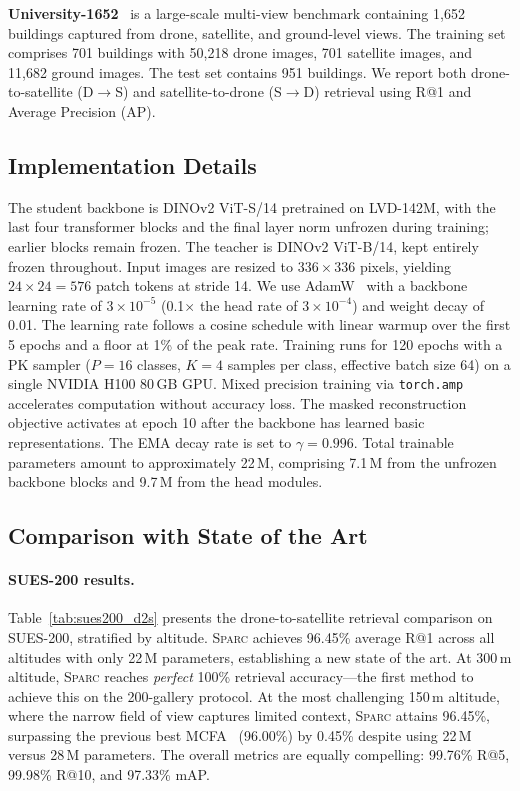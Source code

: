 \documentclass[sigconf, anonymous, review]{acmart}
\newcommand{\ours}{\textsc{Sparc}}
\begin{document}
\textbf{University-1652}~\cite{zheng2020university1652} is a large-scale multi-view benchmark containing 1{,}652 buildings captured from drone, satellite, and ground-level views.
The training set comprises 701 buildings with 50{,}218 drone images, 701 satellite images, and 11{,}682 ground images.
The test set contains 951 buildings.
We report both drone-to-satellite (D${\to}$S) and satellite-to-drone (S${\to}$D) retrieval using R@1 and Average Precision (AP).

\subsection{Implementation Details}
\label{sec:impl}

The student backbone is DINOv2 ViT-S/14 pretrained on LVD-142M, with the last four transformer blocks and the final layer norm unfrozen during training; earlier blocks remain frozen.
The teacher is DINOv2 ViT-B/14, kept entirely frozen throughout.
Input images are resized to $336{\times}336$ pixels, yielding $24{\times}24{=}576$ patch tokens at stride 14.
We use AdamW~\cite{loshchilov2019adamw} with a backbone learning rate of $3{\times}10^{-5}$ (0.1$\times$ the head rate of $3{\times}10^{-4}$) and weight decay of 0.01.
The learning rate follows a cosine schedule with linear warmup over the first 5 epochs and a floor at 1\% of the peak rate.
Training runs for 120 epochs with a PK sampler ($P{=}16$ classes, $K{=}4$ samples per class, effective batch size 64) on a single NVIDIA H100 80\,GB GPU.
Mixed precision training via \texttt{torch.amp} accelerates computation without accuracy loss.
The masked reconstruction objective activates at epoch 10 after the backbone has learned basic representations.
The EMA decay rate is set to $\gamma{=}0.996$.
Total trainable parameters amount to approximately 22\,M, comprising 7.1\,M from the unfrozen backbone blocks and 9.7\,M from the head modules.

\subsection{Comparison with State of the Art}
\label{sec:sota}

\paragraph{SUES-200 results.}
Table~\ref{tab:sues200_d2s} presents the drone-to-satellite retrieval comparison on SUES-200, stratified by altitude.
\ours{} achieves 96.45\% average R@1 across all altitudes with only 22\,M parameters, establishing a new state of the art.
At 300\,m altitude, \ours{} reaches \emph{perfect} 100\% retrieval accuracy---the first method to achieve this on the 200-gallery protocol.
At the most challenging 150\,m altitude, where the narrow field of view captures limited context, \ours{} attains 96.45\%, surpassing the previous best MCFA~\cite{wang2025mcfa} (96.00\%) by 0.45\% despite using 22\,M versus 28\,M parameters.
The overall metrics are equally compelling: 99.76\% R@5, 99.98\% R@10, and 97.33\% mAP.
\end{document}
